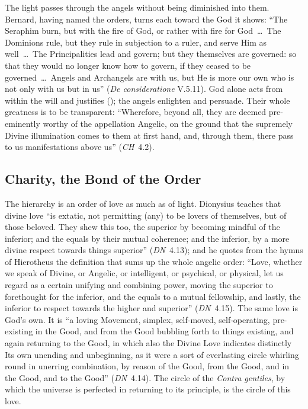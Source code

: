 The light passes through the angels without being diminished into them.
Bernard, having named the orders, turns each toward the God it shows: ``The
Seraphim burn, but with the fire of God, or rather with fire for God~\dots\
The Dominions rule, but they rule in subjection to a ruler, and serve Him as
well~\dots\ The Principalities lead and govern; but they themselves are
governed: so that they would no longer know how to govern, if they ceased to
be governed~\dots\ Angels and Archangels are with us, but He is more our own
who is not only with us but in us'' (\emph{De consideratione} V.5.11). God
alone acts from within the will and justifies (\ST{I q.~106 a.~2});
the angels enlighten and persuade. Their whole greatness is to be
transparent: ``Wherefore, beyond all, they are deemed pre-eminently worthy of
the appellation Angelic, on the ground that the supremely Divine
illumination comes to them at first hand, and, through them, there pass to
us manifestations above us'' (\emph{CH}~4.2).

\subsection{Charity, the Bond of the Order}

The hierarchy is an order of love as much as of light. Dionysius teaches that
divine love ``is extatic, not permitting (any) to be lovers of themselves,
but of those beloved. They shew this too, the superior by becoming mindful
of the inferior; and the equals by their mutual coherence; and the inferior,
by a more divine respect towards things superior'' (\emph{DN}~4.13); and he
quotes from the hymns of Hierotheus the definition that sums up the whole
angelic order: ``Love, whether we speak of Divine, or Angelic, or intelligent,
or psychical, or physical, let us regard as a certain unifying and combining
power, moving the superior to forethought for the inferior, and the equals
to a mutual fellowship, and lastly, the inferior to respect towards the
higher and superior'' (\emph{DN}~4.15). The same love is God's own. It is
``a loving Movement, simplex, self-moved, self-operating, pre-existing in the
Good, and from the Good bubbling forth to things existing, and again
returning to the Good, in which also the Divine Love indicates distinctly Its
own unending and unbeginning, as it were a sort of everlasting circle
whirling round in unerring combination, by reason of the Good, from the
Good, and in the Good, and to the Good'' (\emph{DN}~4.14). The circle of the
\emph{Contra gentiles}, by which the universe is perfected in returning to its
principle, is the circle of this love.

